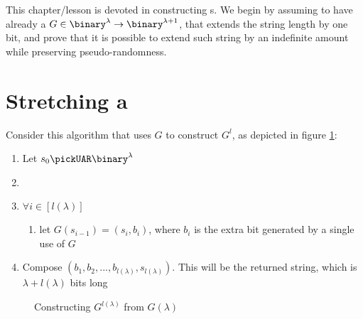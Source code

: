 
This chapter/lesson is devoted in constructing \prg{}s. We begin by assuming to have already a \prg{} $G \in \binary^\lambda \to \binary^{\lambda + 1}$, that extends the string length by one bit, and prove that it is possible to extend such string by an indefinite amount while preserving pseudo-randomness.

\section{Stretching a \prg}

Consider this algorithm that uses $G$ to construct $G^l$, as depicted in figure \ref{fig:gpowerl}:

\begin{enumerate}
    \item Let $s_0 \pickUAR \binary^\lambda$
    \item %
    \item $\forall i \in [l(\lambda)]$
    \begin{enumerate}
        \item let $G(s_{i-1}) = (s_i, b_i)$, where $b_i$ is the extra bit generated by a single use of $G$
    \end{enumerate}
    \item Compose $(b_{1}, b_{2}, ..., b_{{l(\lambda)}}, s_{{l(\lambda)}})$. This will be the returned string, which is $\lambda + l(\lambda)$ bits long
\end{enumerate}

\begin{figure}[h]
    \caption{Constructing $G^{l(\lambda)}$ from $G(\lambda)$}
    \label{fig:gpowerl}
\end{figure}

